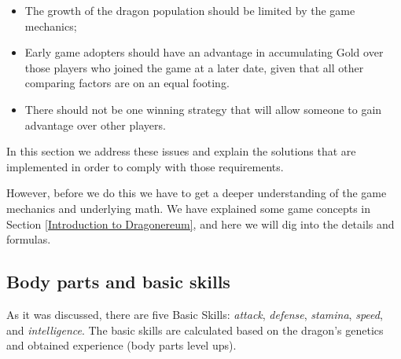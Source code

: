 \documentclass[12pt]{article}
\begin{document}
\begin{itemize}
	\item The growth of the dragon population should be limited by the game mechanics;\par

	\item Early game adopters should have an advantage in accumulating Gold over those players who joined the game at a later date, given that all other comparing factors are on an equal footing.\par

	\item There should not be one winning strategy that will allow someone to gain advantage over other players.
\end{itemize}\par

In this section we address these issues and explain the solutions that are implemented in order to comply with those requirements.\par

However, before we do this we have to get a deeper understanding of the game mechanics and underlying math. We have explained some game concepts in Section \ref{Introduction to Dragonereum}, and here we will dig into the details and formulas.\par

\subsection{Body parts and basic skills}
\label{Body parts and basic skills}  \par

As it was discussed, there are five Basic Skills: \textit{attack}, \textit{defense}, \textit{stamina}, \textit{speed}, and \textit{intelligence}. The basic skills are calculated based on the dragon’s genetics and obtained experience (body parts level ups).\par
\end{document}
